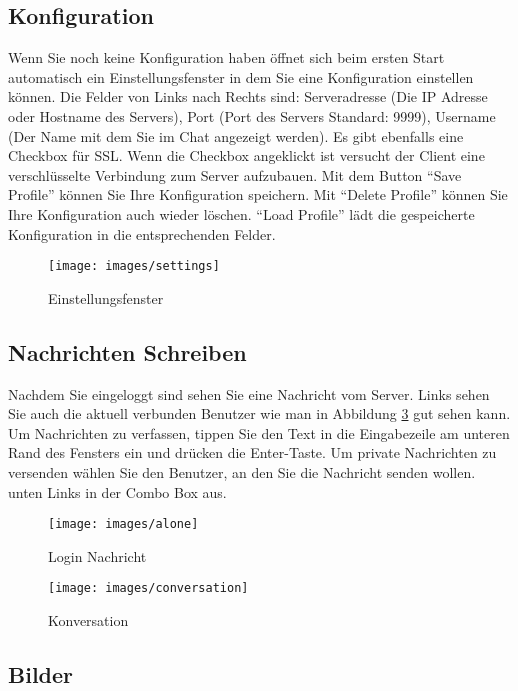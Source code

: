\documentclass[a4paper,ngerman,headsepline, titlepage=firstiscover]{scrartcl}
\begin{document}
\newpage

\subsection{Konfiguration}
Wenn Sie noch keine Konfiguration haben öffnet sich beim ersten Start automatisch ein Einstellungsfenster in dem Sie eine Konfiguration einstellen können. Die Felder von Links nach Rechts sind: Serveradresse (Die IP Adresse oder Hostname des Servers), Port (Port des Servers Standard: 9999), Username (Der Name mit dem Sie im Chat angezeigt werden). Es gibt ebenfalls eine Checkbox für SSL. Wenn die Checkbox angeklickt ist versucht der Client eine verschlüsselte Verbindung zum Server aufzubauen. Mit dem Button \enquote{Save Profile} können Sie Ihre Konfiguration speichern. Mit \enquote{Delete Profile} können Sie Ihre Konfiguration auch wieder löschen. \enquote{Load Profile} lädt die gespeicherte Konfiguration in die entsprechenden Felder.
\begin{figure}[!h]\centering
\texttt{[image: images/settings]}
\caption{Einstellungsfenster\label{fig:settings}}
\end{figure}\clearpage
\newpage

\subsection{Nachrichten  Schreiben}
\noindent Nachdem Sie eingeloggt sind sehen Sie eine Nachricht vom Server. Links sehen Sie auch die aktuell verbunden Benutzer wie man in Abbildung \ref{fig:conversation} gut sehen kann. Um Nachrichten zu verfassen, tippen Sie den Text in die Eingabezeile am unteren Rand des Fensters ein und drücken die Enter-Taste. Um private Nachrichten zu versenden wählen Sie den Benutzer, an den Sie die Nachricht senden wollen. unten Links in der Combo Box aus.

\begin{figure}[!h]\centering
\texttt{[image: images/alone]}
\caption{Login Nachricht \label{fig:alone}}
\end{figure}
\newpage

\begin{figure}[!h]\centering
\texttt{[image: images/conversation]}
\caption{Konversation\label{fig:conversation}}
\end{figure}
\newpage

\subsection{Bilder}
\end{document}
